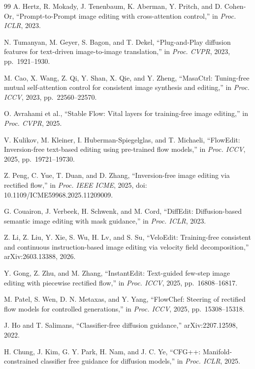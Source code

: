 \begin{thebibliography}{99}
A. Hertz, R. Mokady, J. Tenenbaum, K. Aberman, Y. Pritch, and D. Cohen-Or,
``Prompt-to-Prompt image editing with cross-attention control,'' in \emph{Proc. ICLR}, 2023.

N. Tumanyan, M. Geyer, S. Bagon, and T. Dekel,
``Plug-and-Play diffusion features for text-driven image-to-image translation,'' in \emph{Proc. CVPR}, 2023, pp.~1921--1930.

M. Cao, X. Wang, Z. Qi, Y. Shan, X. Qie, and Y. Zheng,
``MasaCtrl: Tuning-free mutual self-attention control for consistent image synthesis and editing,'' in \emph{Proc. ICCV}, 2023, pp.~22560--22570.

O. Avrahami et al.,
``Stable Flow: Vital layers for training-free image editing,'' in \emph{Proc. CVPR}, 2025.

V. Kulikov, M. Kleiner, I. Huberman-Spiegelglas, and T. Michaeli,
``FlowEdit: Inversion-free text-based editing using pre-trained flow models,'' in \emph{Proc. ICCV}, 2025, pp.~19721--19730.

Z. Peng, C. Yue, T. Duan, and D. Zhang, ``Inversion-free image editing via rectified flow,''
in \emph{Proc. IEEE ICME}, 2025, doi: 10.1109/ICME59968.2025.11209009.

G. Couairon, J. Verbeek, H. Schwenk, and M. Cord,
``DiffEdit: Diffusion-based semantic image editing with mask guidance,'' in \emph{Proc. ICLR}, 2023.

Z. Li, Z. Liu, Y. Xie, S. Wu, H. Lv, and S. Su,
``VeloEdit: Training-free consistent and continuous instruction-based image editing via velocity field decomposition,'' arXiv:2603.13388, 2026.

Y. Gong, Z. Zhu, and M. Zhang, ``InstantEdit: Text-guided few-step image editing with piecewise rectified flow,''
in \emph{Proc. ICCV}, 2025, pp.~16808--16817.

M. Patel, S. Wen, D. N. Metaxas, and Y. Yang, ``FlowChef: Steering of rectified flow models for controlled generations,''
in \emph{Proc. ICCV}, 2025, pp.~15308--15318.

J. Ho and T. Salimans,
``Classifier-free diffusion guidance,'' arXiv:2207.12598, 2022.

H. Chung, J. Kim, G. Y. Park, H. Nam, and J. C. Ye,
``CFG++: Manifold-constrained classifier free guidance for diffusion models,'' in \emph{Proc. ICLR}, 2025.


\end{thebibliography}
